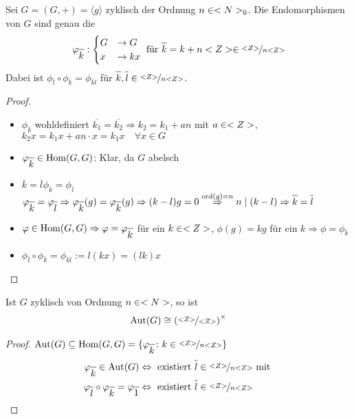 \begin{lemma}
	Sei $G=(G,+) = \langle g\rangle$ zyklisch der Ordnung $n \in <N>_0$. Die Endomorphismen von $G$ sind genau die 
	\begin{align}
		\phi_{\overline{k}}: \begin{cases}
		G &\to G \\
		x &\to kx
		\end{cases} \text{ für } \overline{k} = k + n\whole \in \lnkset{\whole}{n\whole}
	\end{align}
	Dabei ist $\phi_{\overline{l}}\circ\phi_{\overline{k}} = \phi_{\overline{kl}}$ für $\overline{k}, \overline{l} \in \lnkset{\whole}{n\whole}$.\notag
\end{lemma}
\begin{proof}
	\begin{itemize}
		\item $\phi_{\overline{k}}$ wohldefiniert $\overline{k_1} = \overline{k_2} \Rightarrow k_2 = k_1 +an$ mit $a \in <Z>$, $k_2 x = k_1 x + a n \cdot x = k_1 x \quad\forall x \in G$
		\item $\phi_{\overline{k}} \in \Hom(G,G)$: Klar, da $G$ abelsch
		\item $\overline{k}=\overline{l} \phi_{\overline{k}} = \phi_{\overline{l}}$\\
		$\phi_{\overline{k}} = \phi_{\overline{l}} \Rightarrow \phi_{\overline{k}}(g) = \phi_{\overline{k}}(g) \Rightarrow (k-l)g = 0 \overset{\ord(g) =n}{\Rightarrow} n \mid (k-l) \Rightarrow \overline{k} = \overline{l}$
		\item $\phi \in \Hom(G,G) \Rightarrow \phi = \phi_{\overline{k}}$ für ein $k \in <Z>$, $\phi(g) = kg$ für ein $k \Rightarrow \phi = \phi_{\overline{k}}$
		\item $\phi_{\overline{l}} \circ \phi_{\overline{k}} = \phi_{\overline{kl}} := l(kx) = (lk)x$
	\end{itemize}
\end{proof}

\begin{proposition}
	Ist $G$ zyklisch von Ordnung $n \in <N>$, so ist
	\begin{align}
		\operatorname{Aut}(G) \cong \left( \nicefrac{<Z>}{<Z>}\right)^{\times}\notag
	\end{align}
\end{proposition}
\begin{proof}
	$\Aut(G) \subseteq \Hom(G,G) = \{ \phi_{\overline{k}} \colon k \in \lnkset{\whole}{n\whole} \}$\\
	\begin{align}
		\phi_{\overline{k}} \in \Aut(G) &\Leftrightarrow \text{ existiert } \overline{l} \in \lnkset{\whole}{n\whole} \text{ mit }\notag\\ \phi_{\overline{l}} \circ \phi_{\overline{k}} = \phi_{\overline{1}} &\Leftrightarrow \text{ existiert } \overline{l} \in \lnkset{\whole}{n\whole}
	\end{align}
\end{proof}
